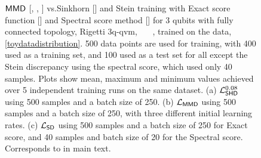 \begin{figure}[ht]
    \caption{$\operatorname{\textsf{MMD}}$ [\crule[cyan]{0.2cm}{0.2cm}, \crule[yellow]{0.2cm}{0.2cm}, \crule[ForestGreen]{0.2cm}{0.2cm}] vs.\@ Sinkhorn [\crule[blue]{0.2cm}{0.2cm}] and Stein training with Exact score function [\crule[red]{0.2cm}{0.2cm}] and Spectral score method [\crule[magenta]{0.2cm}{0.2cm}] for 3 qubits with fully connected topology, Rigetti {\selectfont 3q-qvm}, \protect\ \ \ , trained on the data, \eqref{toydatadistribution}. 500 data points are used for training, with 400 used as a training set, and 100 used as a test set for all except the Stein discrepancy using the spectral score, which used only 40 samples. Plots show mean, maximum and minimum values achieved over 5 independent training runs on the same dataset. (a) $\mathcal{L}^{0.08}_{\operatorname{\textsf{SHD}}}$   using 500 samples and a batch size of 250. (b) $\mathcal{L}_{\operatorname{\textsf{MMD}}}$ using 500 samples and a batch size of 250, with three different initial learning rates. (c) $\mathcal{L}_{\operatorname{\textsf{SD}}}$ using 500 samples and a batch size of 250 for Exact score, and 40 samples and batch size of 20 for the Spectral score. Corresponds to  in main text.}\label{fig:MMDvSinkvStein3_supp}
\end{figure}


